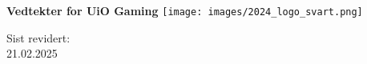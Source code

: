 \begin{titlepage}
\begin{center}
    \vspace*{1cm}

    \Huge
    \textbf{Vedtekter for UiO Gaming}
    \vspace{1cm}
    \vspace{3cm}
    \texttt{[image: images/2024\_logo\_svart.png]}
    \vspace{7cm}

    \LARGE
    Sist revidert:\\
    21.02.2025
\end{center}
\end{titlepage}
